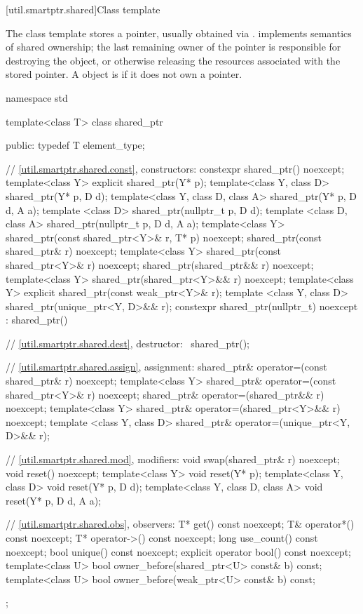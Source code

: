 [util.smartptr.shared]{Class template }

\pnum
{}%
The  class template stores a pointer, usually obtained
via .  implements semantics of shared ownership;
the last remaining owner of the pointer is responsible for destroying
the object, or otherwise releasing the resources associated with the stored pointer. A
 object is  if it does not own a pointer.

\begin{codeblock}
namespace std {
  template<class T> class shared_ptr {
  public:
    typedef T element_type;

    // \ref{util.smartptr.shared.const}, constructors:
    constexpr shared_ptr() noexcept;
    template<class Y> explicit shared_ptr(Y* p);
    template<class Y, class D> shared_ptr(Y* p, D d);
    template<class Y, class D, class A> shared_ptr(Y* p, D d, A a);
    template <class D> shared_ptr(nullptr_t p, D d);
    template <class D, class A> shared_ptr(nullptr_t p, D d, A a);
    template<class Y> shared_ptr(const shared_ptr<Y>& r, T* p) noexcept;
    shared_ptr(const shared_ptr& r) noexcept;
    template<class Y> shared_ptr(const shared_ptr<Y>& r) noexcept;
    shared_ptr(shared_ptr&& r) noexcept;
    template<class Y> shared_ptr(shared_ptr<Y>&& r) noexcept;
    template<class Y> explicit shared_ptr(const weak_ptr<Y>& r);
    template <class Y, class D> shared_ptr(unique_ptr<Y, D>&& r);
    constexpr shared_ptr(nullptr_t) noexcept : shared_ptr() { }

    // \ref{util.smartptr.shared.dest}, destructor:
    ~shared_ptr();

    // \ref{util.smartptr.shared.assign}, assignment:
    shared_ptr& operator=(const shared_ptr& r) noexcept;
    template<class Y> shared_ptr& operator=(const shared_ptr<Y>& r) noexcept;
    shared_ptr& operator=(shared_ptr&& r) noexcept;
    template<class Y> shared_ptr& operator=(shared_ptr<Y>&& r) noexcept;
    template <class Y, class D> shared_ptr& operator=(unique_ptr<Y, D>&& r);

    // \ref{util.smartptr.shared.mod}, modifiers:
    void swap(shared_ptr& r) noexcept;
    void reset() noexcept;
    template<class Y> void reset(Y* p);
    template<class Y, class D> void reset(Y* p, D d);
    template<class Y, class D, class A> void reset(Y* p, D d, A a);

    // \ref{util.smartptr.shared.obs}, observers:
    T* get() const noexcept;
    T& operator*() const noexcept;
    T* operator->() const noexcept;
    long use_count() const noexcept;
    bool unique() const noexcept;
    explicit operator bool() const noexcept;
    template<class U> bool owner_before(shared_ptr<U> const& b) const;
    template<class U> bool owner_before(weak_ptr<U> const& b) const;
  };

}
\end{codeblock}

